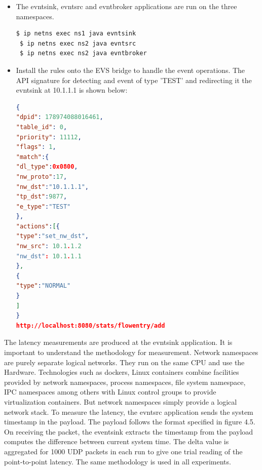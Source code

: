 \begin{itemize}
 \item The evntsink, evntsrc and evntbroker applications are run on the three namespaces.
 \begin{lstlisting}[language=bash]
 $ ip netns exec ns1 java evntsink
 $ ip netns exec ns2 java evntsrc
 $ ip netns exec ns2 java evntbroker \end{lstlisting}
\end{itemize}

\begin{itemize}
 \item Install the rules onto the EVS bridge to handle the event operations. The API signature for detecting and event of type 'TEST' and redirecting it the evntsink at 10.1.1.1 is shown below:
\begin{lstlisting}[language=json,firstnumber=1]
 {
"dpid": 178974088016461,
"table_id": 0,
"priority": 11112,
"flags": 1,
"match":{
"dl_type":0x0800,
"nw_proto":17,
"nw_dst":"10.1.1.1",
"tp_dst":9877,
"e_type":"TEST"
},
"actions":[{
"type":"set_nw_dst",
"nw_src": 10.1.1.2
"nw_dst": 10.1.1.1
},
{
"type":"NORMAL"
}
]
}
http://localhost:8080/stats/flowentry/add \end{lstlisting}
\end{itemize}

The latency measurements are produced at the evntsink application. It is important to understand the methodology for measurement. Network namespaces are purely separate logical networks. They run on the same CPU and use the Hardware. Technologies such as dockers, Linux containers combine facilities provided by network namespaces, process namespaces, file system namespace, IPC namespaces among others with Linux control groups to provide virtualization containers. But network namespaces simply provide a logical network stack. To measure the latency, the evntsrc application sends the system timestamp in the payload. The payload follows the format specified in figure 4.5. On receiving the packet, the eventsink extracts the timestamp from the payload computes the difference between current system time. The delta value is aggregated for 1000 UDP packets in each run to give one trial reading of the point-to-point latency. The same methodology is used in all experiments.

